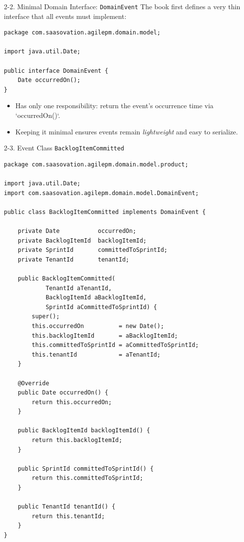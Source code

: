 \documentclass{beamer}
\begin{document}
\begin{frame}[fragile]{2-2. Minimal Domain Interface: \texttt{DomainEvent}}
  \lstset{language=Java} %
  The book first defines a very thin interface that all events must implement:
  \begin{lstlisting}
package com.saasovation.agilepm.domain.model;

import java.util.Date;

public interface DomainEvent {
    Date occurredOn();
}
  \end{lstlisting}
  \begin{itemize}
    \item Has only one responsibility: return the event's occurrence time via `occurredOn()`.
    \item Keeping it minimal ensures events remain \textit{lightweight} and easy to serialize.
  \end{itemize}
\end{frame}

\begin{frame}[fragile]{2-3. Event Class \texttt{BacklogItemCommitted}}
    \lstset{language=Java, basicstyle=\ttfamily\tiny}
\begin{lstlisting}
package com.saasovation.agilepm.domain.model.product;

import java.util.Date;
import com.saasovation.agilepm.domain.model.DomainEvent;

public class BacklogItemCommitted implements DomainEvent {

    private Date           occurredOn;
    private BacklogItemId  backlogItemId;
    private SprintId       committedToSprintId;
    private TenantId       tenantId;

    public BacklogItemCommitted(
            TenantId aTenantId,
            BacklogItemId aBacklogItemId,
            SprintId aCommittedToSprintId) {
        super();
        this.occurredOn          = new Date();
        this.backlogItemId       = aBacklogItemId;
        this.committedToSprintId = aCommittedToSprintId;
        this.tenantId            = aTenantId;
    }

    @Override
    public Date occurredOn() {
        return this.occurredOn;
    }

    public BacklogItemId backlogItemId() {
        return this.backlogItemId;
    }

    public SprintId committedToSprintId() {
        return this.committedToSprintId;
    }

    public TenantId tenantId() {
        return this.tenantId;
    }
}
\end{lstlisting}
\end{frame}
\end{document}
